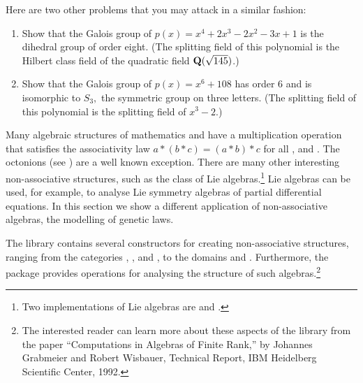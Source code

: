 {{{{{{{{{{{{{{{{{{Here are two other problems that you may attack in a similar fashion:
\begin{enumerate}
\item Show that the Galois group of
$p(x) = x^4 + 2 x^3 - 2 x^2 - 3 x + 1$
is the dihedral group of order eight.
(The splitting field of this polynomial is the Hilbert class field
of
the quadratic field
${\bf Q}(\sqrt{145})$.)
\item Show that the Galois group of
$p(x) = x^6 + 108$
has order 6 and is
isomorphic to $S_3,$ the symmetric group on three letters.
(The splitting field of this polynomial is the splitting field of
$x^3 - 2$.)
\end{enumerate}


Many algebraic structures of mathematics and \Language{}
have a multiplication operation \spadop{*} that satisfies
the associativity law
$a*(b*c) = (a*b)*c$
for all ,  and .
The octonions (see ) are a well known exception.
There are many other interesting non-associative structures, such as the
class of
Lie algebras.\footnote{Two \Language{} implementations of Lie algebras
are  and .}
Lie algebras can be used, for example, to analyse Lie symmetry algebras of
partial differential
equations.
In this section we show a different application of non-associative algebras,
the modelling of genetic laws.

The \Language{} library contains several constructors for
creating non-assoc\-i\-a\-tive structures,
ranging from the categories ,
, and
, to the domains
 and
.
Furthermore, the package  provides
operations for analysing the structure of such algebras.\footnote{%
The interested reader can learn more about these aspects of the
\Language{} library from the paper
``Computations in Algebras of Finite Rank,''
by Johannes Grabmeier and Robert Wisbauer,
Technical Report, IBM Heidelberg Scientific Center, 1992.}

}}}}}}}}}}}}}}}}}}
